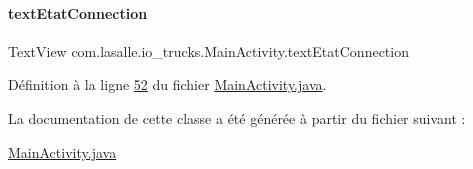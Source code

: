 \paragraph{\texorpdfstring{text\+Etat\+Connection}{textEtatConnection}}
{\footnotesize\ttfamily Text\+View com.\+lasalle.\+io\+\_\+trucks.\+Main\+Activity.\+text\+Etat\+Connection\hspace{0.3cm}{\ttfamily [private]}}



Définition à la ligne \hyperlink{_main_activity_8java_source_l00052}{52} du fichier \hyperlink{_main_activity_8java_source}{Main\+Activity.\+java}.



La documentation de cette classe a été générée à partir du fichier suivant \+:\begin{DoxyCompactItemize}
\item 
\hyperlink{_main_activity_8java}{Main\+Activity.\+java}\end{DoxyCompactItemize}
